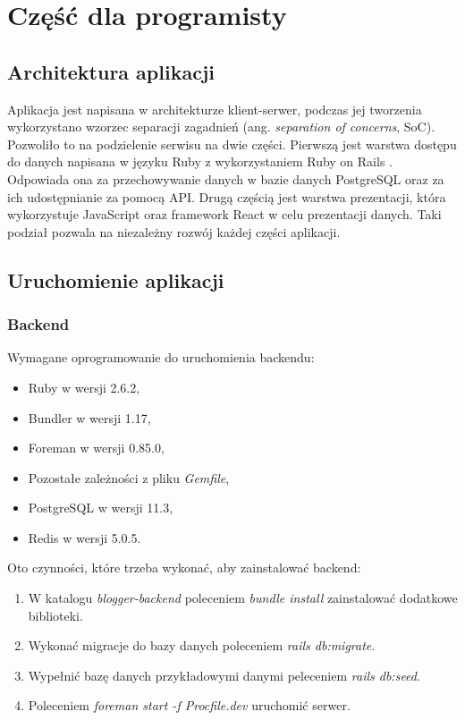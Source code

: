 \documentclass[declaration,shortabstract,polish,inz]{iithesis}
\begin{document}
\chapter{Część dla programisty}
\section{Architektura aplikacji}
Aplikacja jest napisana w architekturze klient-serwer, podczas jej tworzenia wykorzystano wzorzec separacji zagadnień (ang. \textit{separation of concerns}, SoC). Pozwoliło to na podzielenie serwisu na dwie części. Pierwszą jest warstwa dostępu do danych napisana w języku Ruby \cite{ruby} z wykorzystaniem Ruby on Rails \cite{ror}. Odpowiada ona za przechowywanie danych w bazie danych PostgreSQL \cite{postgre} oraz za ich udostępnianie za pomocą API. Drugą częścią jest warstwa prezentacji, która wykorzystuje JavaScript oraz framework React \cite{react} w celu prezentacji danych. Taki podział pozwala na niezależny rozwój każdej części aplikacji.

\section{Uruchomienie aplikacji}

\subsection{Backend}
Wymagane oprogramowanie do uruchomienia backendu:
        \begin{itemize}
            \item Ruby w wersji 2.6.2,
            \item Bundler \cite{bundler} w wersji 1.17,
            \item Foreman \cite{foreman} w wersji 0.85.0,
            \item Pozostałe zależności z pliku \textit{Gemfile},
            \item PostgreSQL w wersji 11.3,
            \item Redis \cite{redis} w wersji 5.0.5.
        \end{itemize}

Oto czynności, które trzeba wykonać, aby zainstalować backend:
\begin{enumerate}
    \item W katalogu \textit{blogger-backend} poleceniem \textit{bundle install} zainstalować dodatkowe biblioteki.
    \item Wykonać migracje do bazy danych poleceniem \textit{rails db:migrate}.
    \item Wypełnić bazę danych przykładowymi danymi peleceniem \textit{rails db:seed}.
    \item Poleceniem \textit{foreman start -f Procfile.dev} uruchomić serwer.
\end{enumerate}
\end{document}
